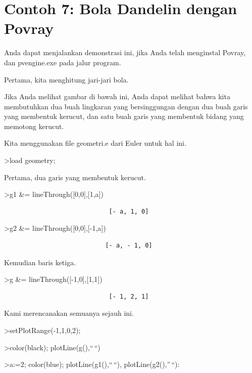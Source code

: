 \documentclass[
]{book}
\begin{document}
\chapter{Contoh 7: Bola Dandelin dengan Povray}\label{contoh-7-bola-dandelin-dengan-povray}

Anda dapat menjalankan demonstrasi ini, jika Anda telah menginstal Povray, dan pvengine.exe pada jalur program.

Pertama, kita menghitung jari-jari bola.

Jika Anda melihat gambar di bawah ini, Anda dapat melihat bahwa kita membutuhkan dua buah lingkaran yang bersinggungan dengan dua buah garis yang membentuk kerucut, dan satu buah garis yang membentuk bidang yang memotong kerucut.

Kita menggunakan file geometri.e dari Euler untuk hal ini.

\textgreater load geometry;

Pertama, dua garis yang membentuk kerucut.

\textgreater g1 \&= lineThrough({[}0,0{]},{[}1,a{]})

\begin{verbatim}
                             [- a, 1, 0]
\end{verbatim}

\textgreater g2 \&= lineThrough({[}0,0{]},{[}-1,a{]})

\begin{verbatim}
                            [- a, - 1, 0]
\end{verbatim}

Kemudian baris ketiga.

\textgreater g \&= lineThrough({[}-1,0{]},{[}1,1{]})

\begin{verbatim}
                             [- 1, 2, 1]
\end{verbatim}

Kami merencanakan semuanya sejauh ini.

\textgreater setPlotRange(-1,1,0,2);

\textgreater color(black); plotLine(g(),``\,``)

\textgreater a:=2; color(blue); plotLine(g1(),``\,``), plotLine(g2(),''\,``):
\end{document}
